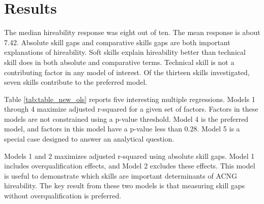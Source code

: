 \documentclass[review]{elsarticle}
\begin{document}
\section{Results}

The median hireability response was eight out of ten.
The mean response is about 7.42.
Absolute skill gaps and comparative skills gaps are both important explanations of hireability.
Soft skills explain hireability better than technical skill does in both absolute and comparative terms.
Technical skill is not a contributing factor in any model of interest.
Of the thirteen skills investigated, seven skills contribute to the preferred model.







Table \ref{tab:table_new_ols} reports five interesting multiple regressions.
Models 1 through 4 maximize adjusted r-squared for a given set of factors.
Factors in these models are not constrained using a p-value threshold.
Model 4 is the preferred model, and factors in this model have a p-value less than $0.28$.
Model 5 is a special case designed to answer an analytical question.

Models 1 and 2 maximizes adjusted r-squared using absolute skill gaps.
Model 1 includes overqualification effects, and Model 2 excludes these effects.
This model is useful to demonstrate which skills are important determinants of ACNG hireability.
The key result from these two models is that measuring skill gaps without overqualification is preferred.
\end{document}
